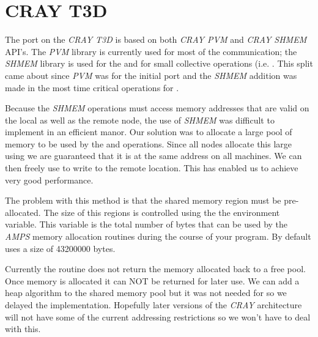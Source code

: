 
\section{CRAY T3D}
\label{CRAY T3D}

The port on the {\em CRAY T3D} is based on both {\em CRAY PVM} and {\em CRAY
SHMEM} API's.  The {\em PVM} library is currently used for most of the
communication; the {\em SHMEM} library is used for the
 and for small collective operations (i.e.
.  This split came about since {\em PVM} was for
the initial port and the {\em SHMEM} addition was made in the most
time critical operations for \parflow{}.

Because the {\em SHMEM} operations must access memory addresses that
are valid on the local as well as the remote node, the use of {\em
SHMEM} was difficult to implement in an efficient manor.  Our solution
was to allocate a large pool of memory to be used by the
 and  operations.  Since all
nodes allocate this large using  we are guaranteed that
it is at the same address on all machines.  We can then freely use
 to write to the remote location.  This has enabled us
to achieve very good performance.

The problem with this method is that the shared memory region must be
pre-allocated.  The size of this regions is controlled using the the
 environment variable.  This variable is the
total number of bytes that can be used by the {\em AMPS} memory
allocation routines during the course of your program.  By default
\parflow{} uses a size of 43200000 bytes.

Currently the  routine does not return the memory
allocated back to a free pool.  Once memory is allocated it can NOT be
returned for later use.  We can add a heap algorithm to the shared
memory pool but it was not needed for \parflow{} so we delayed the
implementation.  Hopefully later versions of the {\em CRAY} architecture will
not have some of the current addressing restrictions so we won't have
to deal with this.



